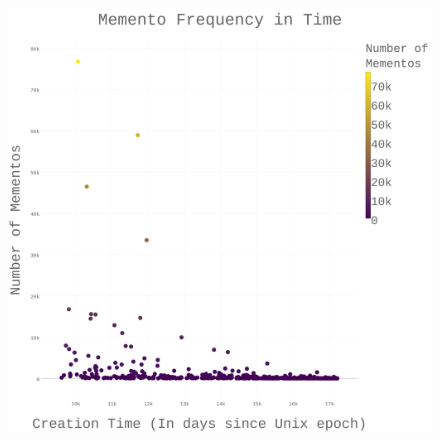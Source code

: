 \documentclass[12pt, a4paper]{article}
\begin{document}
\begin{figure}[h]
    \centering
    \includegraphics[width=\textwidth]{dia/scatter.png}
\end{figure}
\end{document}
